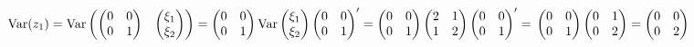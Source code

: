 \begin{problem}
\begin{sol}
$\operatorname{Var} (z_1) = \operatorname{Var}   \begin{pmatrix}
 \begin{pmatrix}
0 & 0 \\
0 & 1 \\
\end{pmatrix}  &  \begin{pmatrix}
\xi_1 \\
\xi_2 \\
\end{pmatrix}  \\
\end{pmatrix}  =  \begin{pmatrix}
0 & 0 \\
0 & 1 \\
\end{pmatrix}  \operatorname{Var}   \begin{pmatrix}
\xi_1 \\
\xi_2 \\
\end{pmatrix}   \begin{pmatrix}
0 & 0 \\
0 & 1 \\
\end{pmatrix} ' =  \begin{pmatrix}
0 & 0 \\
0 & 1 \\
\end{pmatrix}   \begin{pmatrix}
2 & 1 \\
1 & 2 \\
\end{pmatrix}   \begin{pmatrix}
0 & 0 \\
0 & 1 \\
\end{pmatrix} ' = \\
\begin{pmatrix}
0 & 0 \\
0 & 1 \\
\end{pmatrix}   \begin{pmatrix}
0 & 1 \\
0 & 2 \\
\end{pmatrix}  =  \begin{pmatrix}
0 & 0 \\
0 & 2 \\
\end{pmatrix} $
\end{sol}
\end{problem}









